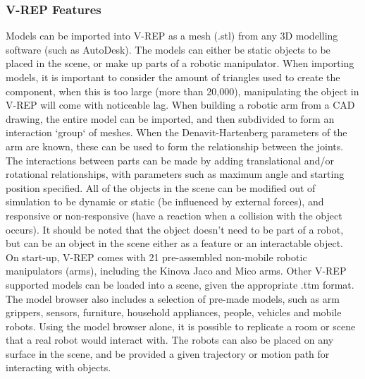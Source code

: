 \documentclass[12pt,openany,a4paper]{book}
\begin{document}
\subsubsection{V-REP Features}

Models can be imported into V-REP as a mesh (.stl) from any 3D modelling software (such as AutoDesk). The models can either be static objects to be placed in the scene, or make up parts of a robotic manipulator. When importing models, it is important to consider the amount of triangles used to create the component, when this is too large (more than 20,000), manipulating the object in V-REP will come with noticeable lag. When building a robotic arm from a CAD drawing, the entire model can be imported, and then subdivided to form an interaction `group` of meshes. When the Denavit-Hartenberg parameters of the arm are known, these can be used to form the relationship between the joints. The interactions between parts can be made by adding translational and/or rotational relationships, with parameters such as maximum angle and starting position specified. All of the objects in the scene can be modified out of simulation to be dynamic or static (be influenced by external forces), and responsive or non-responsive (have a reaction when a collision with the object occurs). It should be noted that the object doesn't need to be part of a robot, but can be an object in the scene either as a feature or an interactable object.\\


On start-up, V-REP comes with 21 pre-assembled non-mobile robotic manipulators (arms), including the Kinova Jaco and Mico arms. Other V-REP supported models can be loaded into a scene, given the appropriate .ttm format. The model browser also includes a selection of pre-made models, such as arm grippers, sensors, furniture, household appliances, people, vehicles and mobile robots. Using the model browser alone, it is possible to replicate a room or scene that a real robot would interact with. The robots can also be placed on any surface in the scene, and be provided a given trajectory or motion path for interacting with objects.\\
\end{document}
